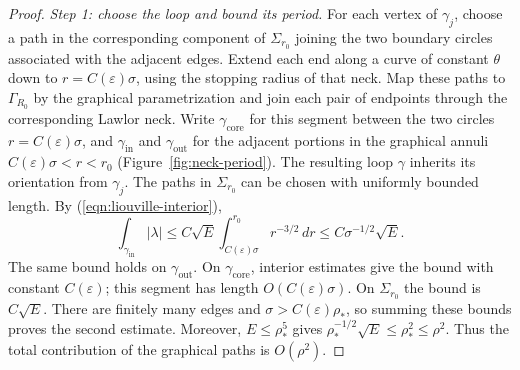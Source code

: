 \documentclass[11pt,a4paper]{article}
\numberwithin{equation}{section}
\theoremstyle{definition}
\theoremstyle{remark}
\begin{document}
	\begin{proof}
		\emph{Step 1: choose the loop and bound its period.}
		For each vertex of $\gamma_j$, choose a path in the corresponding component
		of $\Sigma_{r_0}$ joining the two boundary circles associated with the
		adjacent edges. Extend each end along a curve of constant $\theta$ down
		to $r=C(\varepsilon)\sigma$, using the stopping radius of that neck.
		Map these paths to $\Gamma_{R_0}$ by the graphical parametrization and
		join each pair of endpoints through the corresponding Lawlor neck.
		Write $\gamma_{\mathrm{core}}$ for this segment between the two circles
		$r=C(\varepsilon)\sigma$, and $\gamma_{\mathrm{in}}$ and
		$\gamma_{\mathrm{out}}$ for the adjacent portions in the graphical annuli
		$C(\varepsilon)\sigma<r<r_0$ (Figure~\ref{fig:neck-period}). The resulting loop $\gamma$
		inherits its orientation from $\gamma_j$. The paths in $\Sigma_{r_0}$
		can be chosen with uniformly bounded length.
		By (\ref{eqn:liouville-interior}),
		\[
		\int_{\gamma_{\mathrm{in}}}|\lambda|
		\le C\sqrt E\int_{C(\varepsilon)\sigma}^{r_0}r^{-3/2}\,dr
		\le C\sigma^{-1/2}\sqrt E.
		\]
		The same bound holds on $\gamma_{\mathrm{out}}$. On $\gamma_{\mathrm{core}}$,
		interior estimates give the bound with constant $C(\varepsilon)$;
		this segment has length $O(C(\varepsilon)\sigma)$.
		On $\Sigma_{r_0}$ the
		bound is $C\sqrt E$. There are finitely many edges and
		$\sigma>C(\varepsilon)\rho_*$, so summing these bounds proves the second estimate.
		Moreover, $E\le\rho_*^5$ gives
		$\rho_*^{-1/2}\sqrt E\le\rho_*^2\le\rho^2$.
		Thus the total contribution of the graphical paths is $O(\rho^2)$.
		

\end{proof}
\end{document}
